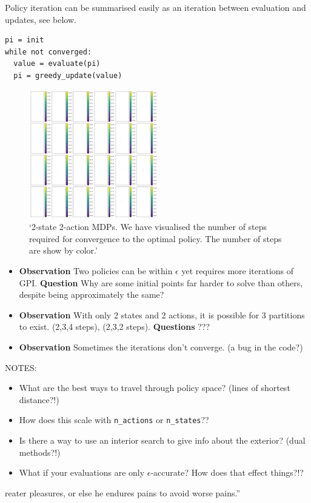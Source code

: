 Policy iteration can be summarised easily as an iteration between
evaluation and updates, see below.

\begin{verbatim}
pi = init
while not converged:
  value = evaluate(pi)
  pi = greedy_update(value)
\end{verbatim}

\begin{figure}
\centering
\includegraphics[width=0.5\textwidth,height=0.5\textheight]{../../pictures/figures/gpi-partitions.png}
\caption{`2-state 2-action MDPs. We have visualised the number of steps
required for convergence to the optimal policy. The number of steps are
show by color.'}
\end{figure}

\begin{itemize}
\item
  \textbf{Observation} Two policies can be within \(\epsilon\) yet
  requires more iterations of GPI. \textbf{Question} Why are some
  initial points far harder to solve than others, despite being
  approximately the same?
\item
  \textbf{Observation} With only 2 states and 2 actions, it is possible
  for 3 partitions to exist. (2,3,4 steps), (2,3,2 steps).
  \textbf{Questions} ???
\item
  \textbf{Observation} Sometimes the iterations don't converge. (a bug
  in the code?)
\end{itemize}

NOTES:

\begin{itemize}
\item
  What are the best ways to travel through policy space? (lines of
  shortest distance?!)
\item
  How does this scale with \texttt{n\_actions} or \texttt{n\_states}??
\item
  Is there a way to use an interior search to give info about the
  exterior? (dual methods?!)
\item
  What if your evaluations are only \(\epsilon\)-accurate? How does that
  effect things?!?
\end{itemize}reater pleasures, or else he endures pains to avoid worse pains.''

